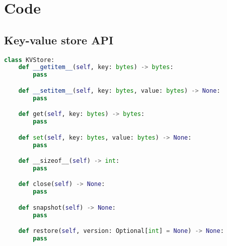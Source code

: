 

\chapter{Code} %

\label{Appendix-A-code} %

\section{Key-value store API}

\begin{lstlisting}[language=Python, caption=API function signatures.]
class KVStore:
    def __getitem__(self, key: bytes) -> bytes:
        pass

    def __setitem__(self, key: bytes, value: bytes) -> None:
        pass

    def get(self, key: bytes) -> bytes:
        pass

    def set(self, key: bytes, value: bytes) -> None:
        pass

    def __sizeof__(self) -> int:
        pass

    def close(self) -> None:
        pass

    def snapshot(self) -> None:
        pass

    def restore(self, version: Optional[int] = None) -> None:
        pass
\end{lstlisting}
    